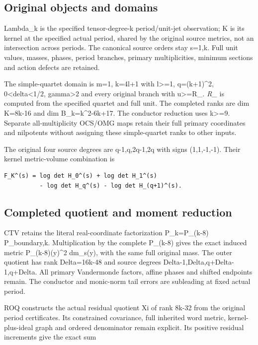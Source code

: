 \documentclass[
]{article}
\begin{document}
\subsection{Original objects and
domains}\label{original-objects-and-domains-1}

Lambda\_k is the specified tensor-degree-k period/unit-jet observation;
K is its kernel at the specified actual period, shared by the original
source metrics, not an intersection across periods. The canonical source
orders stay s=1,k. Full unit values, masses, phases, period branches,
primary multiplicities, minimum sections and action defects are
retained.

The simple-quartet domain is m=1, k=4l+1 with l\textgreater=1,
q=(k+1)\^{}2, 0\textless delta\textless1/2, gamma\textgreater2 and every
original branch with \textbar u\textbar\textgreater=R\_\emph{. R\_} is
computed from the specified quartet and full unit. The completed ranks
are dim K=8k-16 and dim B\_k=k\^{}2-6k+17. The conductor reduction uses
k\textgreater=9. Separate all-multiplicity OCS/OMG maps retain their
full primary coordinates and nilpotents without assigning these
simple-quartet ranks to other inputs.

The original four source degrees are q-1,q,2q-1,2q with signs
(1,1,-1,-1). Their kernel metric-volume combination is

\begin{verbatim}
F_K^(s) = log det H_0^(s) + log det H_1^(s)
          - log det H_q^(s) - log det H_(q+1)^(s).
\end{verbatim}

\subsection{Completed quotient and moment
reduction}\label{completed-quotient-and-moment-reduction}

CTV retains the literal real-coordinate factorization P\_k=P\_(k-8)
P\_boundary,k. Multiplication by the complete P\_(k-8) gives the exact
induced metric \textbar P\_(k-8)(y)\textbar\^{}2 dm\_s(y), with the same
full original mass. The outer quotient has rank Delta=16k-48 and source
degrees Delta-1,Delta,q+Delta-1,q+Delta. All primary Vandermonde
factors, affine phases and shifted endpoints remain. The conductor and
monic-norm tail errors are subleading at fixed actual period.

ROQ constructs the actual residual quotient Xi of rank 8k-32 from the
original period certificates. Its constrained covariance, full inherited
word metric, kernel-plus-ideal graph and ordered denominator remain
explicit. Its positive residual increments give the exact sum
\end{document}
